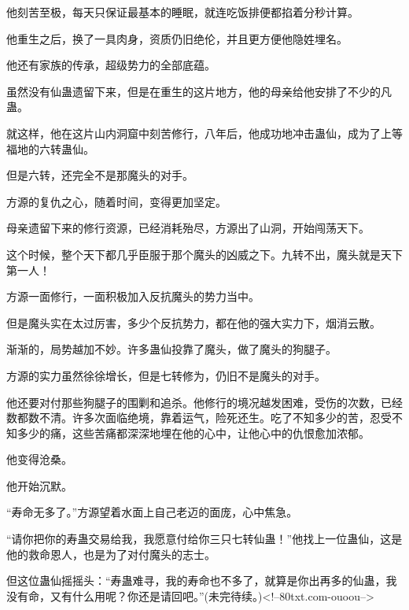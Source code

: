 \begin{this_body}
他刻苦至极，每天只保证最基本的睡眠，就连吃饭排便都掐着分秒计算。

他重生之后，换了一具肉身，资质仍旧绝伦，并且更方便他隐姓埋名。

他还有家族的传承，超级势力的全部底蕴。

虽然没有仙蛊遗留下来，但是在重生的这片地方，他的母亲给他安排了不少的凡蛊。

就这样，他在这片山内洞窟中刻苦修行，八年后，他成功地冲击蛊仙，成为了上等福地的六转蛊仙。

但是六转，还完全不是那魔头的对手。

方源的复仇之心，随着时间，变得更加坚定。

母亲遗留下来的修行资源，已经消耗殆尽，方源出了山洞，开始闯荡天下。

这个时候，整个天下都几乎臣服于那个魔头的凶威之下。九转不出，魔头就是天下第一人！

方源一面修行，一面积极加入反抗魔头的势力当中。

但是魔头实在太过厉害，多少个反抗势力，都在他的强大实力下，烟消云散。

渐渐的，局势越加不妙。许多蛊仙投靠了魔头，做了魔头的狗腿子。

方源的实力虽然徐徐增长，但是七转修为，仍旧不是魔头的对手。

他还要对付那些狗腿子的围剿和追杀。他修行的境况越发困难，受伤的次数，已经数都数不清。许多次面临绝境，靠着运气，险死还生。吃了不知多少的苦，忍受不知多少的痛，这些苦痛都深深地埋在他的心中，让他心中的仇恨愈加浓郁。

他变得沧桑。

他开始沉默。

“寿命无多了。”方源望着水面上自己老迈的面庞，心中焦急。

“请你把你的寿蛊交易给我，我愿意付给你三只七转仙蛊！”他找上一位蛊仙，这是他的救命恩人，也是为了对付魔头的志士。

但这位蛊仙摇摇头：“寿蛊难寻，我的寿命也不多了，就算是你出再多的仙蛊，我没有命，又有什么用呢？你还是请回吧。”(未完待续。)<!--80txt.com-ouoou-->

\end{this_body}

